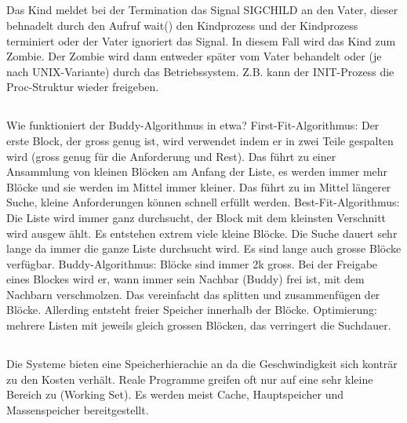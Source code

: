 \subsection{}
\begin{answer}
Das Kind meldet bei der Termination das Signal SIGCHILD an den Vater, dieser behnadelt
durch den Aufruf wait() den Kindprozess und der Kindprozess terminiert
oder der Vater ignoriert das Signal. In diesem Fall wird das Kind zum Zombie. Der Zombie
wird dann entweder später vom Vater behandelt oder (je nach UNIX-Variante) durch das
Betriebssystem. Z.B. kann der INIT-Prozess die Proc-Struktur wieder freigeben.
\end{answer}

\subsection{}
\begin{answer}
Wie funktioniert der Buddy-Algorithmus in etwa?
First-Fit-Algorithmus:
Der erste Block, der gross genug ist, wird verwendet indem er in zwei Teile gespalten wird
(gross genug für die Anforderung und Rest).
Das führt zu einer Ansammlung von kleinen Blöcken am Anfang der Liste, es werden immer
mehr Blöcke und sie werden im Mittel immer kleiner. Das führt zu im Mittel längerer
Suche, kleine Anforderungen können schnell erfüllt werden.
Best-Fit-Algorithmus:
Die Liste wird immer ganz durchsucht, der Block mit dem kleinsten Verschnitt wird ausgew
ählt.
Es entstehen extrem viele kleine Blöcke. Die Suche dauert sehr lange da immer die ganze
Liste durchsucht wird. Es sind lange auch grosse Blöcke verfügbar.
Buddy-Algorithmus:
Blöcke sind immer 2k gross. Bei der Freigabe eines Blockes wird er, wann immer sein
Nachbar (Buddy) frei ist, mit dem Nachbarn verschmolzen.
Das vereinfacht das splitten und zusammenfügen der Blöcke. Allerding entsteht freier Speicher
innerhalb der Blöcke.
Optimierung: mehrere Listen mit jeweils gleich grossen Blöcken, das verringert die Suchdauer.
\end{answer}

\subsection{}
\begin{answer}
Die Systeme bieten eine Speicherhierachie an da die Geschwindigkeit sich konträr zu den
Kosten verhält.
Reale Programme greifen oft nur auf eine sehr kleine Bereich zu (Working Set).
Es werden meist Cache, Hauptspeicher und Massenspeicher bereitgestellt.
\end{answer}

